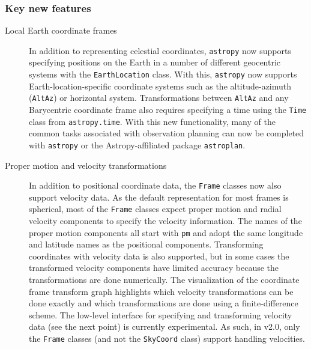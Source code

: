 \documentclass[modern]{aastex61}
\newcommand{\package}[1]{\texttt{#1}\xspace}
\newcommand{\astropy}{Astropy\xspace}
\newcommand{\astropypkg}{\package{astropy}\xspace}
\newcommand{\inlinecomment}[2]{\todo[inline]{#1: #2}\xspace}
\begin{document}
\subsubsection{Key new features}

\begin{description}
    \item[Local Earth coordinate frames] In addition to representing celestial
    coordinates, \astropypkg now supports specifying positions on the Earth in
    a number of different geocentric systems with the \texttt{EarthLocation}
    class.
    With this, \astropypkg now supports Earth-location-specific coordinate
    systems such as the altitude-azimuth (\texttt{AltAz}) or horizontal system.
    Transformations between \texttt{AltAz} and any Barycentric coordinate frame
    also requires specifying a time using the \texttt{Time} class from
    \texttt{astropy.time}.
    With this new functionality, many of the common tasks associated with
    observation planning can now be completed with \astropypkg or the
    \astropy-affiliated package \package{astroplan}\citep{astroplan_AAS}. 

    \item[Proper motion and velocity transformations]
    In addition to positional coordinate data, the \texttt{Frame} classes now
    also support velocity data.
    As the default representation for most frames is spherical, most of the
    \texttt{Frame} classes expect proper motion and radial velocity components
    to specify the velocity information.
    The names of the proper motion components all start with \texttt{pm} and
    adopt the same longitude and latitude names as the positional components.
    Transforming coordinates with velocity data is also supported, but in some
    cases the transformed velocity components have limited accuracy because the
    transformations are done numerically.
    The visualization of the coordinate frame transform graph highlights which
    velocity transformations can be done exactly and which transformations are
    done using a finite-difference scheme.
    The low-level interface for specifying and transforming velocity data (see
    the next point) is currently experimental.
    As such, in v2.0, only the \texttt{Frame} classes (and not the
    \texttt{SkyCoord} class) support handling velocities.


\end{description}
\end{document}
